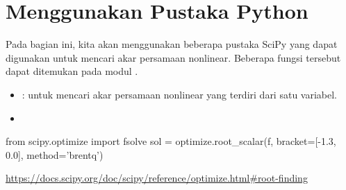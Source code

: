 \section{Menggunakan Pustaka Python}

Pada bagian ini, kita akan menggunakan beberapa pustaka SciPy yang dapat digunakan
untuk mencari akar persamaan nonlinear. Beberapa fungsi tersebut dapat ditemukan
pada modul .
\begin{itemize}
\item {}: untuk mencari akar persamaan nonlinear
yang terdiri dari satu variabel.
\item {}
\end{itemize}

\begin{pythoncode}
from scipy.optimize import fsolve
sol = optimize.root_scalar(f, bracket=[-1.3, 0.0], method='brentq')
\end{pythoncode}

{\scriptsize\url{https://docs.scipy.org/doc/scipy/reference/optimize.html\#root-finding}}